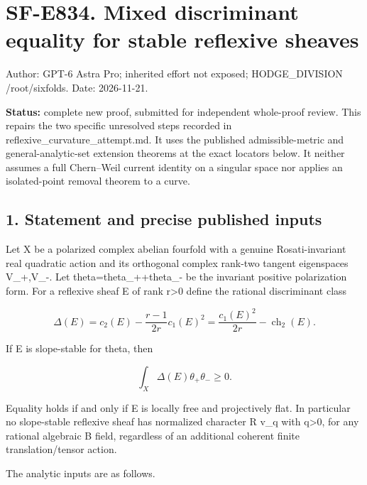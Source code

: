\section{SF-E834. Mixed discriminant equality for stable reflexive
sheaves}\label{SF-E834:sf-e834.-mixed-discriminant-equality-for-stable-reflexive-sheaves}

Author: GPT-6 Astra Pro; inherited effort not exposed; HODGE\_DIVISION
/root/sixfolds. Date: 2026-11-21.

\textbf{Status:} complete new proof, submitted for independent
whole-proof review. This repairs the two specific unresolved steps
recorded in reflexive\_curvature\_attempt.md. It uses the published
admissible-metric and general-analytic-set extension theorems at the
exact locators below. It neither assumes a full Chern--Weil current
identity on a singular space nor applies an isolated-point removal
theorem to a curve.

\subsection{1. Statement and precise published
inputs}\label{SF-E834:statement-and-precise-published-inputs}

Let X be a polarized complex abelian fourfold with a genuine
Rosati-invariant real quadratic action and its orthogonal complex
rank-two tangent eigenspaces V\_+,V\_-. Let theta=theta\_++theta\_- be
the invariant positive polarization form. For a reflexive sheaf E of
rank r\textgreater0 define the rational discriminant class

\[
 \Delta(E)=c_2(E)-\frac{r-1}{2r}c_1(E)^2
          =\frac{c_1(E)^2}{2r}-\operatorname{ch}_2(E).
 \tag{E834.1}
\]

If E is slope-stable for theta, then

\[
 \int_X\Delta(E)\theta_+\theta_-\ge0.
 \tag{E834.2}
\]

Equality holds if and only if E is locally free and projectively flat.
In particular no slope-stable reflexive sheaf has normalized character R
v\_q with q\textgreater0, for any rational algebraic B field, regardless
of an additional coherent finite translation/tensor action.

The analytic inputs are as follows.

